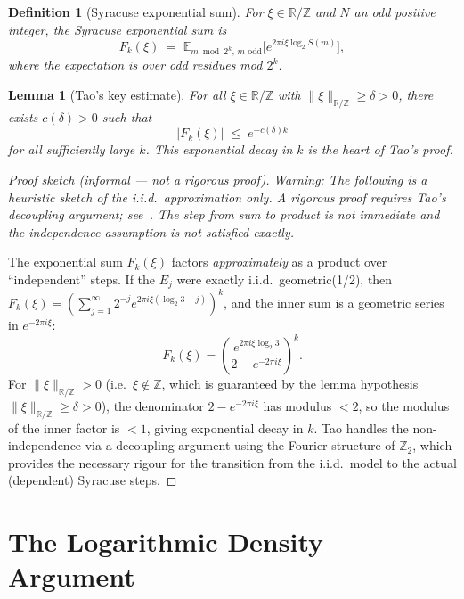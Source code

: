 \documentclass[12pt,a4paper]{article}
\newtheorem{lemma}[theorem]{Lemma}
\newtheorem{definition}[theorem]{Definition}
\begin{document}
\begin{definition}[Syracuse exponential sum]\label{def:exp_sum}
For $\xi \in \mathbb{R}/\mathbb{Z}$ and $N$ an odd positive integer, the
\emph{Syracuse exponential sum} is
\[
  F_k(\xi) \;=\; \mathbb{E}_{m \bmod 2^k,\, m \text{ odd}}\bigl[ e^{2\pi i \xi \log_2 S(m)} \bigr],
\]
where the expectation is over odd residues mod $2^k$.
\end{definition}

\begin{lemma}[Tao's key estimate]\label{lem:key}
For all $\xi \in \mathbb{R}/\mathbb{Z}$ with $\|\xi\|_{\mathbb{R}/\mathbb{Z}} \geq \delta > 0$,
there exists $c(\delta) > 0$ such that
\[
  |F_k(\xi)| \;\leq\; e^{-c(\delta) k}
\]
for all sufficiently large $k$. This exponential decay in $k$ is the heart of Tao's proof.
\end{lemma}

\begin{proof}[Proof sketch (informal — not a rigorous proof)]
\emph{Warning: The following is a heuristic sketch of the i.i.d.\ approximation
only.  A rigorous proof requires Tao's decoupling argument; see~\cite{Tao2022}.
The step from sum to product is not immediate and the independence assumption
is not satisfied exactly.}

The exponential sum $F_k(\xi)$ factors \emph{approximately} as a product over
``independent'' steps. If the $E_j$ were exactly i.i.d.\ geometric(1/2), then
$F_k(\xi) = \left(\sum_{j=1}^\infty 2^{-j} e^{2\pi i \xi (\log_2 3 - j)}\right)^k$,
and the inner sum is a geometric series in $e^{-2\pi i \xi}$:
\[
  F_k(\xi) = \left(\frac{e^{2\pi i \xi \log_2 3}}{2 - e^{-2\pi i \xi}}\right)^k.
\]
For $\|\xi\|_{\mathbb{R}/\mathbb{Z}} > 0$ (i.e.\ $\xi \not\in \mathbb{Z}$, which is
guaranteed by the lemma hypothesis $\|\xi\|_{\mathbb{R}/\mathbb{Z}} \geq \delta > 0$),
the denominator $2 - e^{-2\pi i \xi}$ has modulus $< 2$, so the modulus of the
inner factor is $< 1$, giving exponential decay in $k$.
Tao handles the non-independence via a decoupling argument using the Fourier
structure of $\mathbb{Z}_2$, which provides the necessary rigour for the
transition from the i.i.d.\ model to the actual (dependent) Syracuse steps.
\end{proof}

\section{The Logarithmic Density Argument}
\end{document}
